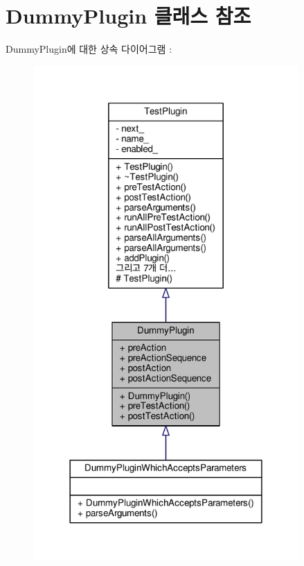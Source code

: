 \hypertarget{class_dummy_plugin}{}\section{Dummy\+Plugin 클래스 참조}
\label{class_dummy_plugin}


Dummy\+Plugin에 대한 상속 다이어그램 \+: 
\nopagebreak
\begin{figure}[H]
\begin{center}
\leavevmode
\includegraphics[width=287pt]{class_dummy_plugin__inherit__graph}
\end{center}
\end{figure}



